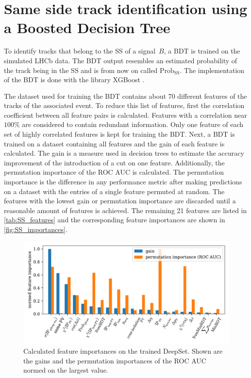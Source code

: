 \section{Same side track identification using a Boosted Decision Tree}
\label{sec:SS_classifier}

To identify tracks that belong to the SS of a signal~$B$, a BDT is trained on the simulated LHCb data. 
The BDT output resembles an estimated probability of the track being in the SS and is from now on called $\text{Prob}_\text{SS}$.
The implementation of the BDT is done with the library XGBoost \cite{xgboost}.

The dataset used for training the BDT contains about 70 different features of the tracks of the associated event.
To reduce this list of features, first the correlation coefficient between all feature pairs is calculated.
Features with a correlation near $100\%$ are considered to contain redundant information.
Only one feature of each set of highly correlated features is kept for training the BDT.
Next, a BDT is trained on a dataset containing all features and the gain of each feature is calculated.
The gain is a measure used in decision trees to estimate the accuracy improvement of the introduction of a cut on one feature.
Additionally, the permutation importance of the ROC AUC is calculated.
The permutation importance is the difference in any performance metric after making predictions on a dataset with the entries of a single feature permuted at random.
The features with the lowest gain or permutation importance are discarded until a reasonable amount of features is achieved.
The remaining 21 features are listed in \autoref{tab:SS_features} and the corresponding feature importances are shown in \autoref{fig:SS_importances}.

\begin{figure}
    \centering
    \includegraphics[width=\textwidth]{images/SS_feature_importances.pdf}
    \caption{Calculated feature importances on the trained DeepSet. Shown are the gains and the permutation importances of the ROC AUC normed on the largest value.}
    \label{fig:SS_importances}
\end{figure}

